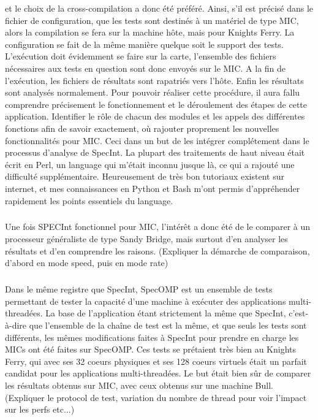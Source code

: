 \documentclass[11pt]{article}
\begin{document}
					et le choix de la cross-compilation a donc été préféré. \newline
					Ainsi, s'il est précisé dans le fichier de configuration, que les tests sont destinés à un matériel de type
					MIC, alors la compilation se fera sur la machine hôte, mais pour Knights Ferry. \newline
					La configuration se fait de la même manière quelque soit le support des tests. \newline
					L'exécution doit évidemment se faire sur la carte, l'ensemble des fichiers nécessaires aux tests en question
					sont donc envoyés sur le MIC. A la fin de l'exécution, les fichiers de résultats sont rapatriés vers l'hôte. \newline
					Enfin les résultats sont analysés normalement. \newline
					Pour pouvoir réaliser cette procédure, il aura fallu comprendre précisement le fonctionnement et le déroulement 
					des étapes de cette application. Identifier le rôle de chacun des modules et les appels des différentes fonctions 
					afin de savoir exactement, où rajouter proprement les nouvelles fonctionnalités pour MIC. Ceci dans un but 
					de les intégrer complétement dans le processus d'analyse de SpecInt. La plupart des traitements de haut niveau 
					était écrit en Perl, un language qui m'était inconnu jusque là, ce qui a rajouté une difficulté supplémentaire. 
					Heureusement de très bon tutoriaux existent sur internet, et mes connaissances en Python et Bash m'ont permis 
					d'appréhender rapidement les points essentiels du language.
					\subparagraph{}
					Une fois SPECInt fonctionnel pour MIC, l'intérêt a donc été de le comparer à un processeur généraliste
					de type Sandy Bridge, mais surtout d'en analyser les résultats et d'en comprendre les raisons.
					(Expliquer la démarche de comparaison, d'abord en mode speed, puis en mode rate)
					\subparagraph{}
					Dans le même registre que SpecInt, SpecOMP est un ensemble de tests permettant de tester la capacité d'une 
					machine à exécuter des applications multi-threadées. La base de l'application étant strictement la même que SpecInt, 
					c'est-à-dire que l'ensemble de la chaîne de test est la même, et que seuls les tests sont différents, les mêmes 
					modifications faites à SpecInt pour prendre en charge les MICs ont été faites sur SpecOMP. \newline
					Ces tests se prétaient très bien au Knights Ferry, qui avec ses 32 coeurs physiques et ses 128 coeurs virtuels 
					était un parfait candidat pour les applications multi-threadées. Le but était bien sûr de comparer les résultats 
					obtenus sur MIC, avec ceux obtenus sur une machine Bull.
					(Expliquer le protocol de test, variation du nombre de thread pour voir l'impact sur les perfs etc...)
\end{document}

